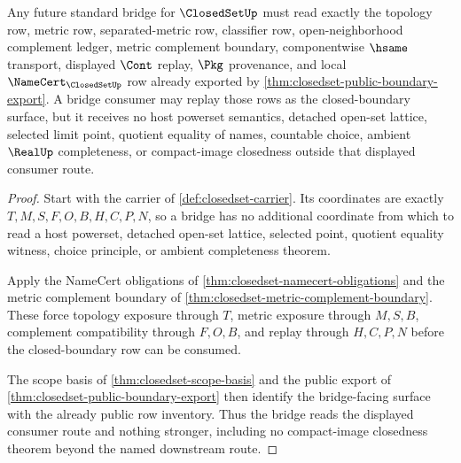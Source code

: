 \begin{theorem}\label{thm:closedset-bridged-boundary-export}
Any future standard bridge for $\ClosedSetUp$ must read exactly the topology row, metric row, separated-metric row, classifier row, open-neighborhood complement ledger, metric complement boundary, componentwise $\hsame$ transport, displayed $\Cont$ replay, $\Pkg$ provenance, and local $\NameCert_{\ClosedSetUp}$ row already exported by \autoref{thm:closedset-public-boundary-export}. A bridge consumer may replay those rows as the closed-boundary surface, but it receives no host powerset semantics, detached open-set lattice, selected limit point, quotient equality of names, countable choice, ambient $\RealUp$ completeness, or compact-image closedness outside that displayed consumer route.
\end{theorem}
\begin{proof}
Start with the carrier of \autoref{def:closedset-carrier}. Its coordinates are exactly $T,M,S,F,O,B,H,C,P,N$, so a bridge has no additional coordinate from which to read a host powerset, detached open-set lattice, selected point, quotient equality witness, choice principle, or ambient completeness theorem.

Apply the NameCert obligations of \autoref{thm:closedset-namecert-obligations} and the metric complement boundary of \autoref{thm:closedset-metric-complement-boundary}. These force topology exposure through $T$, metric exposure through $M,S,B$, complement compatibility through $F,O,B$, and replay through $H,C,P,N$ before the closed-boundary row can be consumed.

The scope basis of \autoref{thm:closedset-scope-basis} and the public export of \autoref{thm:closedset-public-boundary-export} then identify the bridge-facing surface with the already public row inventory. Thus the bridge reads the displayed consumer route and nothing stronger, including no compact-image closedness theorem beyond the named downstream route.
\end{proof}


